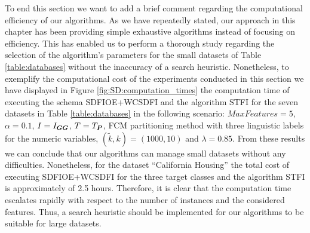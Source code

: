To end this section we want to add a brief comment regarding the computational efficiency of our algorithms. As we have repeatedly stated, our approach in this chapter has been providing simple exhaustive algorithms instead of focusing on efficiency. This has enabled us to perform a thorough study regarding the selection of the algorithm's parameters for the small datasets of Table \ref{table:databases} without the inaccuracy of a search heuristic. Nonetheless, to exemplify the computational cost of the experiments conducted in this section we have displayed in Figure \ref{fig:SD:computation_times} the computation time of executing the schema SDFIOE+WCSDFI and the algorithm STFI for the seven datasets in Table \ref{table:databases} in the following scenario: $MaxFeatures=5$, $\alpha=0.1$, $I=I_{\bm{GG}}$, $T=T_{\bm{P}}$, FCM partitioning method with three linguistic labels for the numeric variables, $(\tilde{k},k)=(1000,10)$ and $\lambda=0.85$. From these results we can conclude that our algorithms can manage small datasets without any difficulties. Nonetheless, for the dataset ``California Housing'' the total cost of executing SDFIOE+WCSDFI for the three target classes and the algorithm STFI is approximately of 2.5 hours. Therefore, it is clear that the computation time escalates rapidly with respect to the number of instances and the considered features. Thus, a search heuristic should be implemented for our algorithms to be suitable for large datasets.
\testdata


